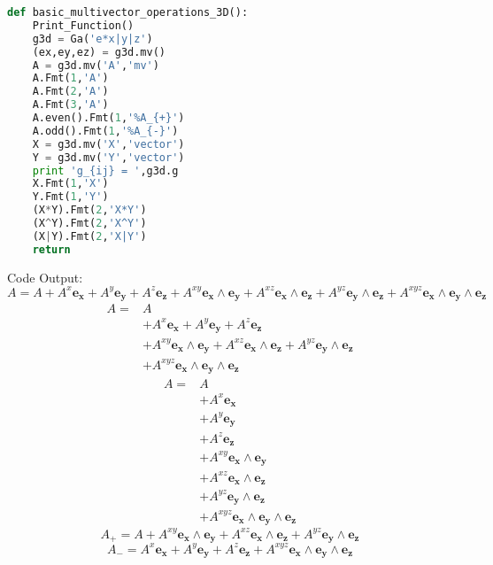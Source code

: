 \documentclass[10pt,fleqn]{report}
\begin{document}
\begin{lstlisting}[language=Python,showspaces=false,showstringspaces=false,backgroundcolor=\color{gray},frame=single]
def basic_multivector_operations_3D():
    Print_Function()
    g3d = Ga('e*x|y|z')
    (ex,ey,ez) = g3d.mv()
    A = g3d.mv('A','mv')
    A.Fmt(1,'A')
    A.Fmt(2,'A')
    A.Fmt(3,'A')
    A.even().Fmt(1,'%A_{+}')
    A.odd().Fmt(1,'%A_{-}')
    X = g3d.mv('X','vector')
    Y = g3d.mv('Y','vector')
    print 'g_{ij} = ',g3d.g
    X.Fmt(1,'X')
    Y.Fmt(1,'Y')
    (X*Y).Fmt(2,'X*Y')
    (X^Y).Fmt(2,'X^Y')
    (X|Y).Fmt(2,'X|Y')
    return
\end{lstlisting}
Code Output:
\begin{equation*} A = A  + A^{x} \boldsymbol{e_{x}} + A^{y} \boldsymbol{e_{y}} + A^{z} \boldsymbol{e_{z}} + A^{xy} \boldsymbol{e_{x}\wedge e_{y}} + A^{xz} \boldsymbol{e_{x}\wedge e_{z}} + A^{yz} \boldsymbol{e_{y}\wedge e_{z}} + A^{xyz} \boldsymbol{e_{x}\wedge e_{y}\wedge e_{z}} \end{equation*}
  \begin{align*} A =  & A  \\  &  + A^{x} \boldsymbol{e_{x}} + A^{y} \boldsymbol{e_{y}} + A^{z} \boldsymbol{e_{z}} \\  &  + A^{xy} \boldsymbol{e_{x}\wedge e_{y}} + A^{xz} \boldsymbol{e_{x}\wedge e_{z}} + A^{yz} \boldsymbol{e_{y}\wedge e_{z}} \\  &  + A^{xyz} \boldsymbol{e_{x}\wedge e_{y}\wedge e_{z}}  \end{align*} 
  \begin{align*} A =  & A  \\  &  + A^{x} \boldsymbol{e_{x}} \\  &  + A^{y} \boldsymbol{e_{y}} \\  &  + A^{z} \boldsymbol{e_{z}} \\  &  + A^{xy} \boldsymbol{e_{x}\wedge e_{y}} \\  &  + A^{xz} \boldsymbol{e_{x}\wedge e_{z}} \\  &  + A^{yz} \boldsymbol{e_{y}\wedge e_{z}} \\  &  + A^{xyz} \boldsymbol{e_{x}\wedge e_{y}\wedge e_{z}}  \end{align*} 
\begin{equation*} A_{+} = A  + A^{xy} \boldsymbol{e_{x}\wedge e_{y}} + A^{xz} \boldsymbol{e_{x}\wedge e_{z}} + A^{yz} \boldsymbol{e_{y}\wedge e_{z}} \end{equation*}
\begin{equation*} A_{-} = A^{x} \boldsymbol{e_{x}} + A^{y} \boldsymbol{e_{y}} + A^{z} \boldsymbol{e_{z}} + A^{xyz} \boldsymbol{e_{x}\wedge e_{y}\wedge e_{z}} \end{equation*}
\end{document}
